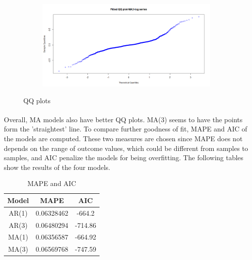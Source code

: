 \documentclass[12pt]{article}
\begin{document}
\begin{figure}[H]
\begin{subfigure}[b]{0.6\linewidth}
  \end{subfigure}
  \begin{subfigure}[b]{0.6\linewidth}
    \includegraphics[width=\linewidth]{figure12-4.png}
  \end{subfigure}
  \caption{QQ plots}
  \label{fig:figure12}
\end{figure}
\paragraph{}
Overall, MA models also have better QQ plots. MA(3) seems to have the points form the 'straightest' line. To compare further goodness of fit, MAPE and AIC of the models are computed. These two measures are chosen since MAPE does not depends on the range of outcome values, which could be different from samples to samples, and AIC penalize the models for being overfitting. The following tables show the results of the four models.

\begin{table}[H]
  \begin{center}
    \caption{MAPE and AIC}
    \label{tab:table1}
    \begin{tabular}{c|c|S} %
      \textbf{Model} & \textbf{MAPE} & \textbf{AIC}\\
      \hline
      AR(1) & 0.06328462 & -664.2\\
      AR(3) & 0.06480294 & -714.86\\
      MA(1) & 0.06356587 & -664.92\\
      MA(3) & 0.06569768 & -747.59\\
    \end{tabular}
  \end{center}
\end{table}
\end{document}
